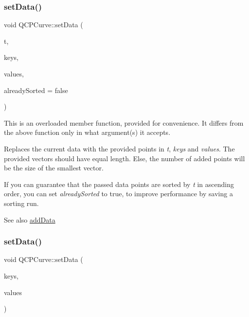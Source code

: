 \subsubsection{\texorpdfstring{setData()}{setData()}\hspace{0.1cm}{\footnotesize\ttfamily [2/3]}}
{\footnotesize\ttfamily void Q\+C\+P\+Curve\+::set\+Data (\begin{DoxyParamCaption}\item[{const Q\+Vector$<$ double $>$ \&}]{t,  }\item[{const Q\+Vector$<$ double $>$ \&}]{keys,  }\item[{const Q\+Vector$<$ double $>$ \&}]{values,  }\item[{bool}]{already\+Sorted = {\ttfamily false} }\end{DoxyParamCaption})}

This is an overloaded member function, provided for convenience. It differs from the above function only in what argument(s) it accepts.

Replaces the current data with the provided points in {\itshape t}, {\itshape keys} and {\itshape values}. The provided vectors should have equal length. Else, the number of added points will be the size of the smallest vector.

If you can guarantee that the passed data points are sorted by {\itshape t} in ascending order, you can set {\itshape already\+Sorted} to true, to improve performance by saving a sorting run.

\begin{DoxySeeAlso}{See also}
\mbox{\hyperlink{class_q_c_p_curve_a73edf394b94f3f24f07518e30565a07f}{add\+Data}} 
\end{DoxySeeAlso}
\mbox{\label{class_q_c_p_curve_a9d3245d43304226e013240c94802f7f6}} 
\subsubsection{\texorpdfstring{setData()}{setData()}\hspace{0.1cm}{\footnotesize\ttfamily [3/3]}}
{\footnotesize\ttfamily void Q\+C\+P\+Curve\+::set\+Data (\begin{DoxyParamCaption}\item[{const Q\+Vector$<$ double $>$ \&}]{keys,  }\item[{const Q\+Vector$<$ double $>$ \&}]{values }\end{DoxyParamCaption})}

